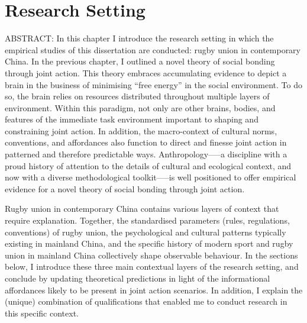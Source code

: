 \chapter{\label{chap:researchSetting}Research Setting}


\minitoc



ABSTRACT:
In this chapter I introduce the research setting in which the empirical studies of this dissertation are conducted: rugby union in contemporary China.  In the previous chapter, I outlined a novel theory of social bonding through joint action.  This theory embraces accumulating evidence to depict a brain in the business of minimising ``free energy'' in the social environment. To do so, the brain relies on resources distributed throughout multiple layers of environment.  Within this paradigm, not only are other brains, bodies, and features of the immediate task environment important to shaping and constraining joint action.  In addition, the macro-context of cultural norms, conventions, and affordances also function to direct and finesse joint action in patterned and therefore predictable ways.  Anthropology—--a discipline with a proud history of attention to the details of cultural and ecological context, and now with a diverse methodological toolkit—--is well positioned to offer empirical evidence for a novel theory of social bonding through joint action.

Rugby union in contemporary China contains various layers of context that require explanation.  Together, the standardised parameters (rules, regulations, conventions) of rugby union, the psychological and cultural patterns typically existing in mainland China, and the specific history of modern sport and rugby union in mainland China collectively shape observable behaviour.  In the sections below, I introduce these three main contextual layers of the research setting, and conclude by updating theoretical predictions in light of the informational affordances likely to be present in joint action scenarios.  In addition, I explain the (unique) combination of qualifications that enabled me to conduct research in this specific context.




